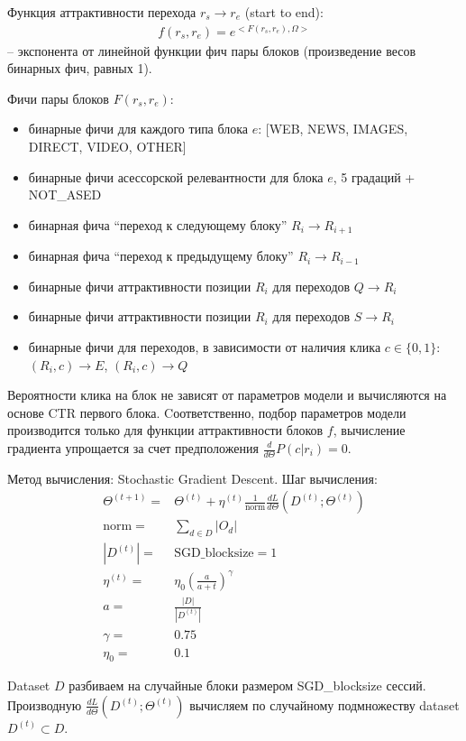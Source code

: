\documentclass[12pt,a4paper]{article}
\begin{document}
Функция аттрактивности перехода $r_s\to r_e$ (start to end): 
\begin{align}
f(r_s, r_e)=e^{<F(r_s, r_e), \Omega>}
\end{align}
 -- экспонента от линейной функции фич пары блоков (произведение весов бинарных фич, равных 1).

Фичи пары блоков $F(r_s, r_e)$:
\begin{itemize}
 \item бинарные фичи для каждого типа блока $e$: [WEB, NEWS, IMAGES, DIRECT, VIDEO, OTHER]
 \item бинарные фичи асессорской релевантности для блока $e$, 5 градаций + NOT\_ASED
 \item бинарная фича ``переход к следующему блоку'' $R_i \to R_{i+1}$
 \item бинарная фича ``переход к предыдущему блоку'' $R_i \to R_{i-1}$
 \item бинарные фичи аттрактивности позиции $R_i$ для переходов $Q \to R_i$
 \item бинарные фичи аттрактивности позиции $R_i$ для переходов $S \to R_i$
 \item бинарные фичи для переходов, в зависимости от наличия клика $c\in \{0,1\}$: $(R_i, c) \to E$, $(R_i, c) \to Q$
\end{itemize}

Вероятности клика на блок не зависят от параметров модели и вычисляются на основе CTR первого блока. Cоответственно, подбор параметров модели производится только для функции аттрактивности блоков $f$, вычисление градиента упрощается за счет предположения $\frac{d}{d\Theta}P(c|r_i)=0$.

Метод вычисления: Stochastic Gradient Descent. Шаг вычисления:
\begin{align}
\Theta^{(t+1)} =& \Theta^{(t)} + \eta^{(t)} 
        \frac{1}{\mathrm{norm}} 
        \frac{dL}{d\Theta}(D^{(t)}; \Theta^{(t)})
\\
\mathrm{norm} =& \sum_{d \in D} |O_d|
\\
|D^{(t)}| = & \mathrm{SGD\_blocksize} = 1
\\
\eta^{(t)} = & \eta_0 \left( \frac{a}{a+t} \right)^\gamma
\\
a = & \frac{|D|}{|D^{(t)}|}
\\
\gamma = & 0.75
\\
\eta_0 = & 0.1
\end{align}

Dataset $D$ разбиваем на случайные блоки размером SGD\_blocksize сессий. Производную $\frac{dL}{d\Theta}(D^{(t)}; \Theta^{(t)})$ вычисляем по случайному подмножеству dataset $D^{(t)} \subset D$.
\end{document}
